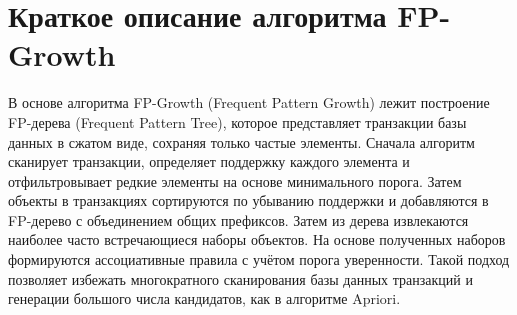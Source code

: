 \chapter{Краткое описание алгоритма FP-Growth}

В основе алгоритма FP-Growth (Frequent Pattern Growth) лежит построение FP-дерева (Frequent Pattern Tree), которое представляет транзакции базы данных в сжатом виде, сохраняя только частые элементы. Сначала алгоритм сканирует транзакции, определяет поддержку каждого элемента и отфильтровывает редкие элементы на основе минимального порога. Затем объекты в транзакциях сортируются по убыванию поддержки и добавляются в FP-дерево с объединением общих префиксов. Затем из дерева извлекаются наиболее часто встречающиеся наборы объектов. На основе полученных наборов формируются ассоциативные правила с учётом порога уверенности. Такой подход позволяет избежать многократного сканирования базы данных транзакций и генерации большого числа кандидатов, как в алгоритме Apriori.

\clearpage
